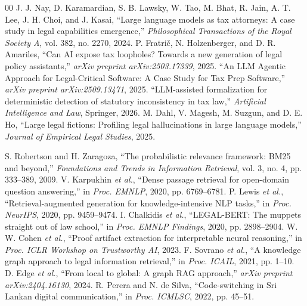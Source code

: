 \documentclass[conference]{IEEEtran}
\begin{document}
\begin{thebibliography}{00}
 J. J. Nay, D. Karamardian, S. B. Lawsky, W. Tao, M. Bhat, R. Jain, A. T. Lee, J. H. Choi, and J. Kasai, ``Large language models as tax attorneys: A case study in legal capabilities emergence,'' \textit{Philosophical Transactions of the Royal Society A}, vol. 382, no. 2270, 2024.
 P. Fratri\v{c}, N. Holzenberger, and D. R. Amariles, ``Can AI expose tax loopholes? Towards a new generation of legal policy assistants,'' \textit{arXiv preprint arXiv:2503.17339}, 2025.
 ``An LLM Agentic Approach for Legal-Critical Software: A Case Study for Tax Prep Software,'' \textit{arXiv preprint arXiv:2509.13471}, 2025.
 ``LLM-assisted formalization for deterministic detection of statutory inconsistency in tax law,'' \textit{Artificial Intelligence and Law}, Springer, 2026.
 M. Dahl, V. Magesh, M. Suzgun, and D. E. Ho, ``Large legal fictions: Profiling legal hallucinations in large language models,'' \textit{Journal of Empirical Legal Studies}, 2025.

 S. Robertson and H. Zaragoza, ``The probabilistic relevance framework: BM25 and beyond,'' \textit{Foundations and Trends in Information Retrieval}, vol. 3, no. 4, pp. 333--389, 2009.
 V. Karpukhin \textit{et al.}, ``Dense passage retrieval for open-domain question answering,'' in \textit{Proc. EMNLP}, 2020, pp. 6769--6781.
 P. Lewis \textit{et al.}, ``Retrieval-augmented generation for knowledge-intensive NLP tasks,'' in \textit{Proc. NeurIPS}, 2020, pp. 9459--9474.
 I. Chalkidis \textit{et al.}, ``LEGAL-BERT: The muppets straight out of law school,'' in \textit{Proc. EMNLP Findings}, 2020, pp. 2898--2904.
 W. W. Cohen \textit{et al.}, ``Proof artifact extraction for interpretable neural reasoning,'' in \textit{Proc. ICLR Workshop on Trustworthy AI}, 2023.
 F. Sovrano \textit{et al.}, ``A knowledge graph approach to legal information retrieval,'' in \textit{Proc. ICAIL}, 2021, pp. 1--10.
 D. Edge \textit{et al.}, ``From local to global: A graph RAG approach,'' \textit{arXiv preprint arXiv:2404.16130}, 2024.
 R. Perera and N. de Silva, ``Code-switching in Sri Lankan digital communication,'' in \textit{Proc. ICMLSC}, 2022, pp. 45--51.


\end{thebibliography}
\end{document}
